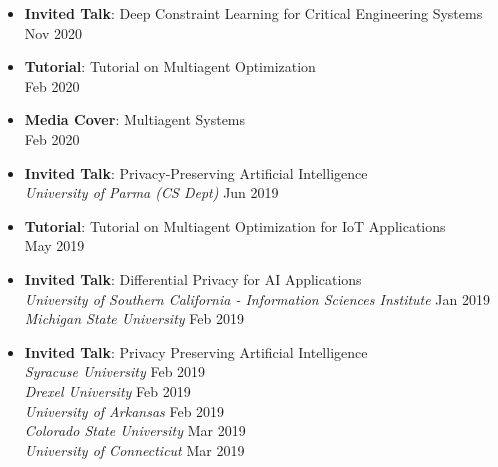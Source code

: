 \begin{itemize}

  \item {\bf Invited Talk}: Deep Constraint Learning for Critical Engineering Systems\\
  \hfill {Nov 2020}

  \item {\bf Tutorial}: {Tutorial on Multiagent Optimization}\\ 
  \hfill {Feb 2020}

  \item {\bf Media Cover}: {Multiagent Systems} \\
   \hfill{Feb 2020}

  \item {\bf Invited Talk}: 
  Privacy-Preserving Artificial Intelligence\\
  {\em University of Parma (CS Dept)} 
  \hfill {Jun 2019}

  \item {\bf Tutorial}: {Tutorial on Multiagent Optimization for IoT Applications}\\ 
  \hfill {May 2019}

  \item {\bf Invited Talk}: Differential Privacy for AI Applications\\
  {\em University of Southern California - Information Sciences Institute} \hfill {Jan 2019}\\
  {\em Michigan State University} \hfill {Feb 2019}

  \item {\bf Invited Talk}: Privacy Preserving Artificial Intelligence\\
  {\em Syracuse University} \hfill {Feb 2019}\\
  {\em Drexel University} \hfill {Feb 2019}\\
  {\em University of Arkansas} \hfill {Feb 2019}\\
  {\em Colorado State University} \hfill {Mar 2019}\\
  {\em University of Connecticut} \hfill {Mar 2019}


\end{itemize}
